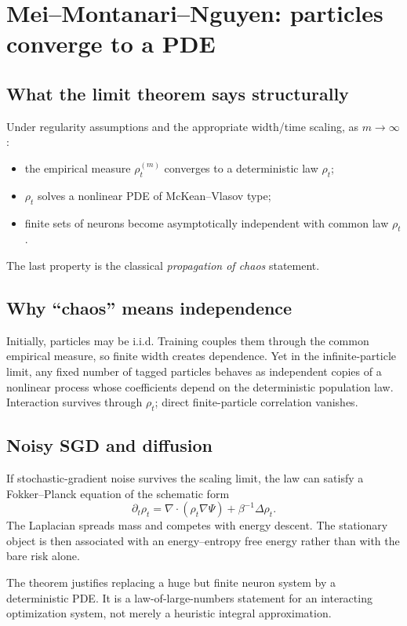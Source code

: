 \documentclass[11pt,a4paper,oneside,openany]{memoir}
\theoremstyle{definition}
\begin{document}
\chapter{Mei--Montanari--Nguyen: particles converge to a PDE}
\section{What the limit theorem says structurally}
Under regularity assumptions and the appropriate width/time scaling, as $m\to\infty$:
\begin{itemize}
\item the empirical measure $\rho_t^{(m)}$ converges to a deterministic law $\rho_t$;
\item $\rho_t$ solves a nonlinear PDE of McKean--Vlasov type;
\item finite sets of neurons become asymptotically independent with common law $\rho_t$.
\end{itemize}
The last property is the classical \emph{propagation of chaos} statement.

\section{Why ``chaos'' means independence}
Initially, particles may be i.i.d.  Training couples them through the common empirical measure, so finite width creates dependence.  Yet in the infinite-particle limit, any fixed number of tagged particles behaves as independent copies of a nonlinear process whose coefficients depend on the deterministic population law.  Interaction survives through $\rho_t$; direct finite-particle correlation vanishes.

\section{Noisy SGD and diffusion}
If stochastic-gradient noise survives the scaling limit, the law can satisfy a Fokker--Planck equation of the schematic form
\[
\partial_t\rho_t
=\nabla\cdot(\rho_t\nabla\Psi)
+\beta^{-1}\Delta\rho_t.
\]
The Laplacian spreads mass and competes with energy descent.  The stationary object is then associated with an energy--entropy free energy rather than with the bare risk alone.

\begin{presentbox}
The theorem justifies replacing a huge but finite neuron system by a deterministic PDE.  It is a law-of-large-numbers statement for an interacting optimization system, not merely a heuristic integral approximation.
\end{presentbox}
\end{document}
